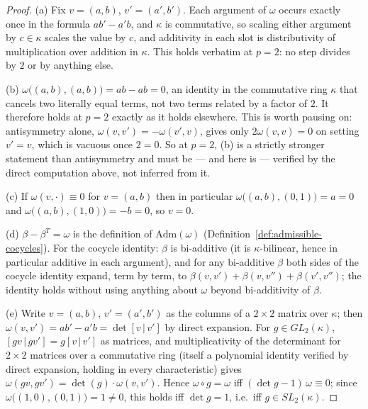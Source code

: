 \begin{proof}
(a) Fix $v=(a,b)$, $v'=(a',b')$. Each argument of $\omega$ occurs exactly
once in the formula $ab'-a'b$, and $\kappa$ is commutative, so scaling either
argument by $c\in\kappa$ scales the value by $c$, and additivity in each slot
is distributivity of multiplication over addition in $\kappa$. This holds
verbatim at $p=2$: no step divides by $2$ or by anything else.

(b) $\omega\big((a,b),(a,b)\big) = ab-ab=0$, an identity in the commutative
ring $\kappa$ that cancels two literally equal terms, not two terms related
by a factor of $2$. It therefore holds at $p=2$ exactly as it holds
elsewhere. This is worth pausing on: antisymmetry alone, $\omega(v,v')=-\omega(v',v)$,
gives only $2\omega(v,v)=0$ on setting $v'=v$, which is vacuous once $2=0$.
So at $p=2$, (b) is a strictly stronger statement than antisymmetry and must
be — and here is — verified by the direct computation above, not inferred
from it.

(c) If $\omega(v,\cdot)\equiv 0$ for $v=(a,b)$ then in particular
$\omega\big((a,b),(0,1)\big)=a=0$ and $\omega\big((a,b),(1,0)\big)=-b=0$, so
$v=0$.

(d) $\beta-\beta^T=\omega$ is the definition of $\mathrm{Adm}(\omega)$
(Definition~\ref{def:admissible-cocycles}). For the cocycle identity: $\beta$
is bi-additive (it is $\kappa$-bilinear, hence in particular additive in each
argument), and for any bi-additive $\beta$ both sides of the cocycle identity
expand, term by term, to $\beta(v,v')+\beta(v,v'')+\beta(v',v'')$; the
identity holds without using anything about $\omega$ beyond bi-additivity of
$\beta$.

(e) Write $v=(a,b)$, $v'=(a',b')$ as the columns of a $2\times 2$ matrix over
$\kappa$; then $\omega(v,v')=ab'-a'b=\det[v\,|\,v']$ by direct expansion. For
$g\in GL_2(\kappa)$, $[gv\,|\,gv']=g[v\,|\,v']$ as matrices, and
multiplicativity of the determinant for $2\times 2$ matrices over a
commutative ring (itself a polynomial identity verified by direct expansion,
holding in every characteristic) gives $\omega(gv,gv')=\det(g)\cdot\omega(v,v')$.
Hence $\omega\circ g=\omega$ iff $(\det g - 1)\,\omega \equiv 0$; since
$\omega\big((1,0),(0,1)\big)=1\neq 0$, this holds iff $\det g = 1$, i.e.\ iff
$g\in SL_2(\kappa)$.


\end{proof}
